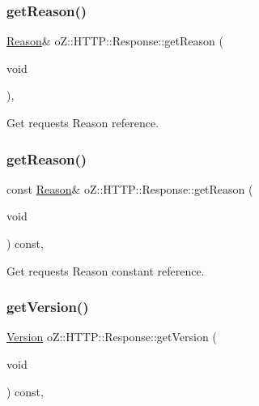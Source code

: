 \subsubsection{\texorpdfstring{getReason()}{getReason()}\hspace{0.1cm}{\footnotesize\ttfamily [1/2]}}
{\footnotesize\ttfamily \mbox{\hyperlink{namespaceo_z_1_1_h_t_t_p_afcd8b91e5e8a7b6df0a7b3b298ec3965}{Reason}}\& o\+Z\+::\+H\+T\+T\+P\+::\+Response\+::get\+Reason (\begin{DoxyParamCaption}\item[{void}]{ }\end{DoxyParamCaption})\hspace{0.3cm}{\ttfamily [inline]}, {\ttfamily [noexcept]}}



Get request\textquotesingle{}s Reason reference. 

\mbox{\label{classo_z_1_1_h_t_t_p_1_1_response_a9b05303e7b76a04d3ab4ed8960de130c}} 
\subsubsection{\texorpdfstring{getReason()}{getReason()}\hspace{0.1cm}{\footnotesize\ttfamily [2/2]}}
{\footnotesize\ttfamily const \mbox{\hyperlink{namespaceo_z_1_1_h_t_t_p_afcd8b91e5e8a7b6df0a7b3b298ec3965}{Reason}}\& o\+Z\+::\+H\+T\+T\+P\+::\+Response\+::get\+Reason (\begin{DoxyParamCaption}\item[{void}]{ }\end{DoxyParamCaption}) const\hspace{0.3cm}{\ttfamily [inline]}, {\ttfamily [noexcept]}}



Get request\textquotesingle{}s Reason constant reference. 

\mbox{\label{classo_z_1_1_h_t_t_p_1_1_response_a13290e5dcd0ae675e0c48af54c074dbc}} 
\subsubsection{\texorpdfstring{getVersion()}{getVersion()}}
{\footnotesize\ttfamily \mbox{\hyperlink{structo_z_1_1_h_t_t_p_1_1_version}{Version}} o\+Z\+::\+H\+T\+T\+P\+::\+Response\+::get\+Version (\begin{DoxyParamCaption}\item[{void}]{ }\end{DoxyParamCaption}) const\hspace{0.3cm}{\ttfamily [inline]}, {\ttfamily [noexcept]}}



